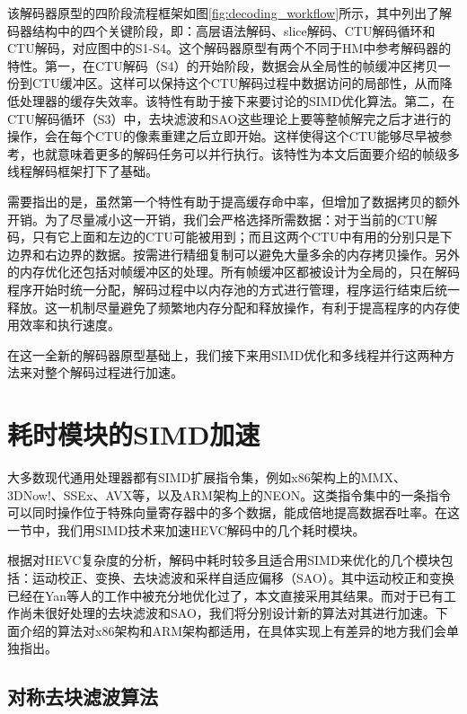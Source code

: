 该解码器原型的四阶段流程框架如图\ref{fig:decoding_workflow}所示，其中列出了解码器结构中的四个关键阶段，即：高层语法解码、slice解码、CTU解码循环和CTU解码，对应图中的S1-S4。这个解码器原型有两个不同于HM中参考解码器的特性。第一，在CTU解码（S4）的开始阶段，数据会从全局性的帧缓冲区拷贝一份到CTU缓冲区。这样可以保持这个CTU解码过程中数据访问的局部性，从而降低处理器的缓存失效率。该特性有助于接下来要讨论的SIMD优化算法。第二，在CTU解码循环（S3）中，去块滤波和SAO这些理论上要等整帧解完之后才进行的操作，会在每个CTU的像素重建之后立即开始。这样使得这个CTU能够尽早被参考，也就意味着更多的解码任务可以并行执行。该特性为本文后面要介绍的帧级多线程解码框架打下了基础。

需要指出的是，虽然第一个特性有助于提高缓存命中率，但增加了数据拷贝的额外开销。为了尽量减小这一开销，我们会严格选择所需数据：对于当前的CTU解码，只有它上面和左边的CTU可能被用到；而且这两个CTU中有用的分别只是下边界和右边界的数据。按需进行精细复制可以避免大量多余的内存拷贝操作。另外的内存优化还包括对帧缓冲区的处理。所有帧缓冲区都被设计为全局的，只在解码程序开始时统一分配，解码过程中以内存池的方式进行管理，程序运行结束后统一释放。这一机制尽量避免了频繁地内存分配和释放操作，有利于提高程序的内存使用效率和执行速度。

在这一全新的解码器原型基础上，我们接下来用SIMD优化和多线程并行这两种方法来对整个解码过程进行加速。

\section{耗时模块的SIMD加速}

大多数现代通用处理器都有SIMD扩展指令集，例如x86架构上的MMX、3DNow!、SSEx、AVX等\supercite{Intel-manual}，以及ARM架构上的NEON\supercite{ARM-manual}。这类指令集中的一条指令可以同时操作位于特殊向量寄存器中的多个数据，能成倍地提高数据吞吐率。在这一节中，我们用SIMD技术来加速HEVC解码中的几个耗时模块。

根据对HEVC复杂度的分析\supercite{Bossen-TCSVT2012,Yan-VCIP2012}，解码中耗时较多且适合用SIMD来优化的几个模块包括：运动校正、变换、去块滤波和采样自适应偏移（SAO）。其中运动校正和变换已经在Yan等人的工作\supercite{Yan-VCIP2012}中被充分地优化过了，本文直接采用其结果。而对于已有工作尚未很好处理的去块滤波和SAO，我们将分别设计新的算法对其进行加速。下面介绍的算法对x86架构和ARM架构都适用，在具体实现上有差异的地方我们会单独指出。

\subsection{对称去块滤波算法}

